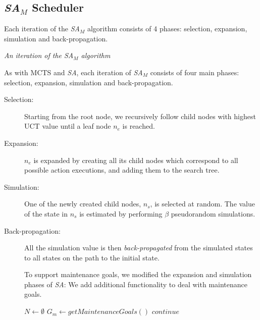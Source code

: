 \documentclass[portrait, plainsections]{sciposter}
\newcommand{\SAM}{\emph{SA}$_M$\xspace}
\newcommand{\SA}{\emph{SA}\xspace}
\begin{document}
\begin{multicols}{3}
\section*{\SAM Scheduler}

\begin{figure}[H]
\end{figure}

Each iteration of the \SAM algorithm consists of 4 phases: selection, expansion, simulation and back-propagation.

\begin{figure}[H]
\end{figure}

\vspace*{-4mm}
\centerline{\textit{An iteration of the \SAM algorithm}}

As with MCTS and \SA, each iteration of \SAM consists of four main phases: selection, expansion, simulation and back-propagation.

\begin{description}
\item[Selection:] Starting from the root node, we recursively follow child nodes with highest UCT value until a leaf node $n_e$ is reached.

\item [Expansion:] $n_e$ is expanded by creating all its child nodes which correspond to all possible action executions, and adding them to the search tree. 
\item[Simulation:]  One of the newly created child nodes, $n_s$, is selected at random. The value of the state in $n_s$ is estimated by performing $\beta$ pseudorandom simulations.
\item [Back-propagation:] All the simulation value is then \emph{back-propagated} from the simulated states to all states on the path to the initial state. 

To support maintenance goals, we modified the expansion and simulation phases of \SA:
We add additional functionality to deal with maintenance goals.
\begin{shaded}
  \begin{algorithmic}
      \State $N \gets \emptyset$
      \State $G_m \gets getMaintenanceGoals()$
      \State $continue$


\end{algorithmic}
\end{shaded}
\end{description}
\end{multicols}
\end{document}
